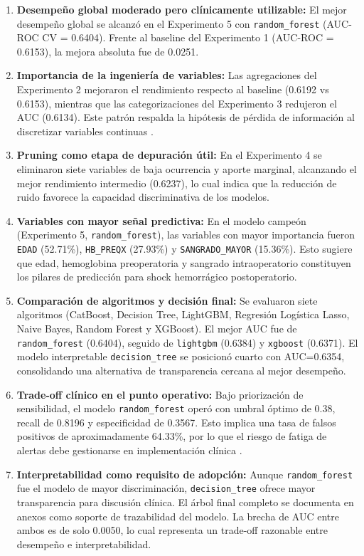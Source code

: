 \begin{enumerate}
    \item \textbf{Desempeño global moderado pero clínicamente utilizable:} El mejor desempeño global se alcanzó en el Experimento 5 con \texttt{random\_forest} (AUC-ROC CV = 0.6404). Frente al baseline del Experimento 1 (AUC-ROC = 0.6153), la mejora absoluta fue de 0.0251.

    \item \textbf{Importancia de la ingeniería de variables:} Las agregaciones del Experimento 2 mejoraron el rendimiento respecto al baseline (0.6192 vs 0.6153), mientras que las categorizaciones del Experimento 3 redujeron el AUC (0.6134). Este patrón respalda la hipótesis de pérdida de información al discretizar variables continuas \cite{ma2023}.

    \item \textbf{Pruning como etapa de depuración útil:} En el Experimento 4 se eliminaron siete variables de baja ocurrencia y aporte marginal, alcanzando el mejor rendimiento intermedio (0.6237), lo cual indica que la reducción de ruido favorece la capacidad discriminativa de los modelos.

    \item \textbf{Variables con mayor señal predictiva:} En el modelo campeón (Experimento 5, \texttt{random\_forest}), las variables con mayor importancia fueron \texttt{EDAD} (52.71\%), \texttt{HB\_PREQX} (27.93\%) y \texttt{SANGRADO\_MAYOR} (15.36\%). Esto sugiere que edad, hemoglobina preoperatoria y sangrado intraoperatorio constituyen los pilares de predicción para shock hemorrágico postoperatorio.

    \item \textbf{Comparación de algoritmos y decisión final:} Se evaluaron siete algoritmos (CatBoost, Decision Tree, LightGBM, Regresión Logística Lasso, Naive Bayes, Random Forest y XGBoost). El mejor AUC fue de \texttt{random\_forest} (0.6404), seguido de \texttt{lightgbm} (0.6384) y \texttt{xgboost} (0.6371). El modelo interpretable \texttt{decision\_tree} se posicionó cuarto con AUC=0.6354, consolidando una alternativa de transparencia cercana al mejor desempeño.

    \item \textbf{Trade-off clínico en el punto operativo:} Bajo priorización de sensibilidad, el modelo \texttt{random\_forest} operó con umbral óptimo de 0.38, recall de 0.8196 y especificidad de 0.3567. Esto implica una tasa de falsos positivos de aproximadamente 64.33\%, por lo que el riesgo de fatiga de alertas debe gestionarse en implementación clínica \cite{steyerberg2018}.

    \item \textbf{Interpretabilidad como requisito de adopción:} Aunque \texttt{random\_forest} fue el modelo de mayor discriminación, \texttt{decision\_tree} ofrece mayor transparencia para discusión clínica. El árbol final completo se documenta en anexos como soporte de trazabilidad del modelo. La brecha de AUC entre ambos es de solo 0.0050, lo cual representa un trade-off razonable entre desempeño e interpretabilidad.
\end{enumerate}


